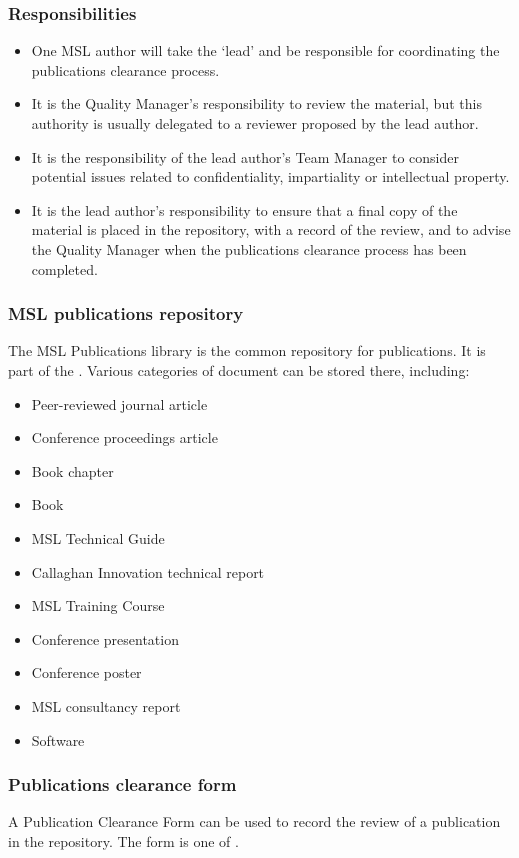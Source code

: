\subsubsection{Responsibilities}
\begin{itemize}
\item  One MSL author will take the `lead' and be responsible for coordinating the publications clearance process.
\item  It is the Quality Manager's responsibility to review the material, but this authority is usually delegated to a reviewer proposed by the lead author.
\item  It is the responsibility of the lead author's Team Manager to consider potential issues related to confidentiality, impartiality or intellectual property.
\item  It is the lead author's responsibility to ensure that a final copy of the material is placed in the repository, with a record of the review, and to advise the Quality Manager when the publications clearance process has been completed.
\end{itemize}

\subsubsection{MSL publications repository}
 \label{sss:publications_repository}
The MSL Publications library is the common repository for publications. It is part of the . Various categories of document can be stored there, including: 
\begin{itemize}
 \item Peer-reviewed journal article
 \item Conference proceedings article 
 \item Book chapter
 \item Book
 \item MSL Technical Guide
 \item Callaghan Innovation technical report 
 \item MSL Training Course 
 \item Conference presentation 
 \item Conference poster
 \item MSL consultancy report
 \item Software
\end{itemize}

\subsubsection{Publications clearance form}
A Publication Clearance Form can be used to record the review of a publication in the repository. The form is one of .

